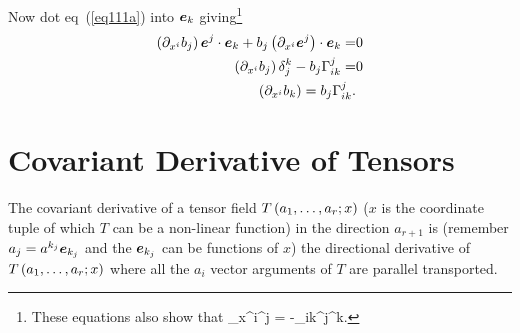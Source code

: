 Now dot eq~(\ref{eq111a}) into $\bm{e}_{k}$ giving\footnote{These equations also show that
\be
	\partial_{x^{i}}\eb^{j} = -\Gamma_{ik}^{j}\eb^{k}.
\ee}
\begin{align}
	\left ( {\partial_{x^{i}}b_{j}} \right )\bm{e}^{j}\cdot\bm{e}_{k} + b_{j}\left ( {\partial_{x^{i}}\bm{e}^{j}} \right )\cdot\bm{e}_{k} =& 0  \nonumber \\
	\left ( {\partial_{x^{i}}b_{j}} \right )\delta_{j}^{k} - b_{j}\Gamma_{ik}^{j} =& 0 \nonumber \\
	\left ( {\partial_{x^{i}}b_{k}} \right ) = b_{j}\Gamma_{ik}^{j}.
\end{align}

\section{Covariant Derivative of Tensors}
The covariant derivative of a tensor field ${T}\left ( {a_{1},\dots,a_{r};x} \right )$ ($x$ is the coordinate tuple of which $T$ can be a non-linear function) in the direction $a_{r+1}$ is (remember $a_{j} = a^{k_{j}}\bm{e}_{k_{j}}$ and the $\bm{e}_{k_{j}}$ can be functions of $x$)
the directional derivative of ${T}\left ( {a_{1},\dots,a_{r};x} \right )$ where all the $a_{i}$ vector arguments of $T$ are parallel transported. 


